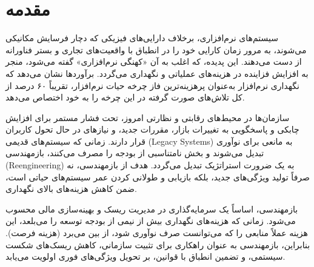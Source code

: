 \section{مقدمه}
\label{sec:ch4-intro}

سیستم‌های نرم‌افزاری، برخلاف دارایی‌های فیزیکی که دچار فرسایش مکانیکی می‌شوند، به مرور زمان کارایی خود را در انطباق با واقعیت‌های تجاری و بستر فناورانه از دست می‌دهند. این پدیده، که اغلب به آن «کهنگی نرم‌افزاری» گفته می‌شود، منجر به افزایش فزاینده در هزینه‌های عملیاتی و نگهداری می‌گردد. برآوردها نشان می‌دهد که نگهداری نرم‌افزار به‌عنوان پرهزینه‌ترین فاز چرخه حیات نرم‌افزار، تقریباً ۶۰ درصد از کل تلاش‌های صورت گرفته در این چرخه را به خود اختصاص می‌دهد.

سازمان‌ها در محیط‌های رقابتی و نظارتی امروز، تحت فشار مستمر برای افزایش چابکی و پاسخگویی به تغییرات بازار، مقررات جدید، و نیازهای در حال تحول کاربران قرار دارند. زمانی که سیستم‌های قدیمی (Legacy Systems) به مانعی برای نوآوری تبدیل می‌شوند و بخش نامتناسبی از بودجه را مصرف می‌کنند، بازمهندسی (Reengineering) به یک ضرورت استراتژیک تبدیل می‌گردد. هدف از بازمهندسی، نه صرفاً تولید ویژگی‌های جدید، بلکه بازیابی و طولانی کردن عمر سیستم‌های حیاتی است، ضمن کاهش هزینه‌های بالای نگهداری.

بازمهندسی، اساساً یک سرمایه‌گذاری در مدیریت ریسک و بهینه‌سازی مالی محسوب می‌شود. زمانی که هزینه‌های نگهداری بیش از نیمی از بودجه توسعه را می‌بلعد، این هزینه عملاً منابعی را که می‌توانست صرف نوآوری شود، از بین می‌برد (هزینه فرصت). بنابراین، بازمهندسی به عنوان راهکاری برای تثبیت سازمانی، کاهش ریسک‌های شکست سیستمی، و تضمین انطباق با قوانین، بر تحویل ویژگی‌های فوری اولویت می‌یابد.
